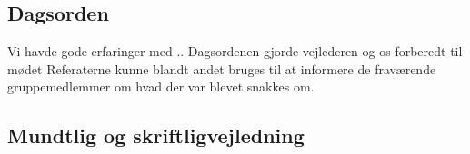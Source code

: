 \subsection{Dagsorden}
Vi havde gode erfaringer med ..
Dagsordenen gjorde vejlederen og os forberedt til mødet
Referaterne kunne blandt andet bruges til at informere de fraværende gruppemedlemmer om hvad der var blevet snakkes om.


\subsection{Mundtlig og skriftligvejledning}